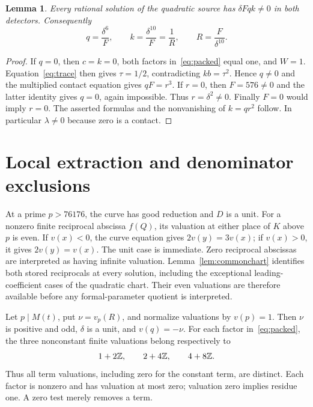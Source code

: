 \documentclass[11pt,a4paper]{article}
\newtheorem{lemma}[theorem]{Lemma}
\begin{document}
\begin{lemma}\label{lem:domain}
Every rational solution of the quadratic source has $\delta Fqk\ne0$
in both detectors. Consequently
\[
 q=\frac{\delta^6}{F},\qquad
 k=\frac{\delta^{10}}F=\frac1R,
 \qquad R=\frac F{\delta^{10}}.
\]
\end{lemma}
\begin{proof}
If $q=0$, then $c=k=0$, both factors in~\eqref{eq:packed} equal one,
and $W=1$. Equation~\eqref{eq:trace} then gives $\tau=1/2$,
contradicting $kb=\tau^2$. Hence $q\ne0$ and the multiplied contact
equation gives $qF=r^3$.
If $r=0$, then $F=576\ne0$ and the latter identity gives $q=0$,
again impossible. Thus $r=\delta^2\ne0$. Finally $F=0$ would imply
$r=0$. The asserted formulas and the nonvanishing of $k=qr^2$ follow.
In particular $\lambda\ne0$ because zero is a contact.
\end{proof}

\section{Local extraction and denominator exclusions}

At a prime $p>76176$, the curve has good reduction and $D$ is a unit.
For a nonzero finite reciprocal abscissa $f(Q)$, its valuation at
either place of $K$ above $p$ is even. If $v(x)<0$, the curve equation
gives $2v(y)=3v(x)$; if $v(x)>0$, it gives $2v(y)=v(x)$.
The unit case is immediate. Zero reciprocal abscissas are interpreted
as having infinite valuation.
Lemma~\ref{lem:commonchart} identifies both stored reciprocals at every
solution, including the exceptional leading-coefficient cases of the
quadratic chart. Their even valuations are therefore available before
any formal-parameter quotient is interpreted.

Let $p\mid M(t)$, put $\nu=v_p(R)$, and normalize valuations by
$v(p)=1$. Then $\nu$ is positive and odd, $\delta$ is a unit, and
$v(q)=-\nu$. For each factor in~\eqref{eq:packed}, the three
nonconstant finite valuations belong respectively to
\[
                     1+2\mathbb Z,\qquad 2+4\mathbb Z,\qquad4+8\mathbb Z.
\]
Thus all term valuations, including zero for the constant term, are
distinct. Each factor is nonzero and has valuation at most zero;
valuation zero implies residue one. A zero test merely removes a term.
\end{document}
